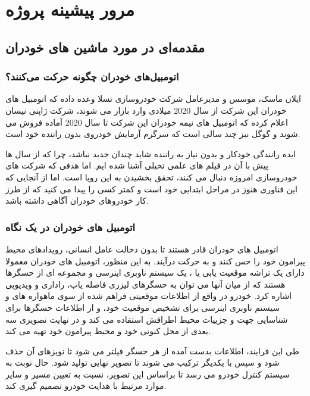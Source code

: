 \chapter{مرور پیشینه پروژه}\label{ch:rl}

\section{مقدمه‌ای در مورد ماشین های خودران}
\subsection{اتومبیل‌های خودران چگونه حرکت می‌کنند؟}
 ایلان ماسک، موسس و مدیرعامل شرکت خودروسازی تسلا وعده داده که اتومبیل های خودران این شرکت از سال 2020 میلادی وارد بازار می شوند، شرکت ژاپنی نیسان اعلام کرده که اتومبیل های نیمه خودران این شرکت تا سال 2020 آماده فروش می شوند و گوگل نیز چند سالی است که سرگرم آزمایش خودروی بدون راننده خود است.

ایده رانندگی خودکار و بدون نیاز به راننده شاید چندان جدید نباشد، چرا که از سال ها پیش با آن در فیلم های علمی تخیلی آشنا شده ایم. اما هدفی که شرکت های خودروسازی امروزه دنبال می کنند، تحقق بخشیدن به این رویا است. اما از آنجایی که این فناوری هنوز در مراحل ابتدایی خود است و کمتر کسی را پیدا می کنید که از طرز کار خودروهای خودران آگاهی داشته باشد.







\subsection{اتومبیل های خودران در یک نگاه}

اتومبیل های خودران قادر هستند تا بدون دخالت عامل انسانی، رویدادهای محیط پیرامون خود را حس کنند و به حرکت درآیند. به این منظور، اتومبیل های خودران معمولا دارای یک تراشه موقعیت یابی یا ، یک سیستم ناوبری اینرسی و مجموعه ای از حسگرها هستند که از میان آنها می توان به حسگرهای لیزری فاصله یاب، راداری و ویدیویی اشاره کرد. خودرو در واقع از اطلاعات موقعیتی فراهم شده از سوی ماهواره های  و سیستم ناوبری اینرسی برای تشخیص موقعیت خود، و از اطلاعات حسگرها برای شناسایی جهت و جزییات محیط اطرافش استفاده می کند و در نهایت تصویری سه بعدی از محل کنونی خود و محیط پیرامون خود تهیه می کند.

طی این فرایند، اطلاعات بدست آمده از هر حسگر فیلتر می شود تا نویزهای آن حذف شود و سپس با یکدیگر ترکیب می شوند تا تصویر نهایی تولید شود. حال نوبت به سیستم کنترل خودرو می رسد تا براساس این تصویر، نسبت به تعیین مسیر و سایر موارد مرتبط با هدایت خودرو تصمیم گیری کند.

